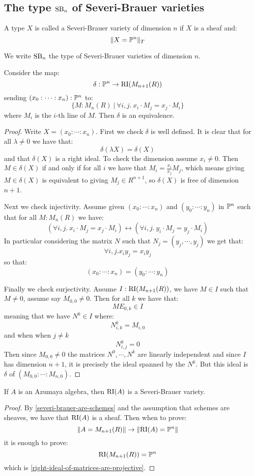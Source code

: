 \subsection{The type $\mathrm{SB}_n$ of Severi-Brauer varieties}

\begin{definition}
A type $X$ is called a Severi-Brauer variety of dimension $n$ if $X$ is a sheaf and:
\[\lVert X=\mathbb{P}^n \rVert_T\]
\end{definition}

We write $\mathrm{SB}_n$ the type of Severi-Brauer varieties of dimension $n$.

\begin{lemma}\label{right-ideal-of-matrices-are-projective}
Consider the map:
\[\delta:\mathbb{P}^n \to \mathrm{RI}(M_{n+1}(R))\]
sending $(x_0:\cdots:x_n):\mathbb{P}^n$ to:
\[\{M:M_n(R)\ |\ \forall i,j.\ x_i\cdot M_j = x_j\cdot M_i\}\]
where $M_i$ is the $i$-th line of $M$. Then $\delta$ is an equivalence.
\end{lemma}

\begin{proof}
Write $X=(x_0:\cdots:x_n)$. First we check $\delta$ is well defined. It is clear that for all $\lambda\not=0$ we have that:
\[\delta(\lambda X) = \delta(X)\]
and that $\delta(X)$ is a right ideal. To check the dimension assume $x_i\not=0$. Then $M\in\delta(X)$ if and only if for all $i$ we have that $M_i = \frac{x_i}{x_j} M_j$, which means giving $M\in\delta(X)$ is equivalent to giving $M_j\in R^{n+1}$, so $\delta(X)$ is free of dimension $n+1$.

Next we check injectivity. Assume given $(x_0:\cdots:x_n)$ and $(y_0:\cdots:y_n)$ in $\mathbb{P}^n$ such that for all $M:M_n(R)$ we have:
\[(\forall i,j.\ x_i\cdot M_j = x_j\cdot M_i) \leftrightarrow (\forall i,j.\ y_i\cdot M_j = y_j\cdot M_i)\]
In particular considering the matrix $N$ such that $N_j = (y_j,\cdots,y_j)$ we get that:
\[\forall i,j. x_iy_j=x_iy_j\] 
so that:
\[(x_0:\cdots:x_n) = (y_0:\cdots:y_n)\]

Finally we check surjectivity. Assume $I:\mathrm{RI}(M_{n+1}(R))$, we have $M\in I$ such that $M\not=0$, assume say $M_{0,0}\not=0$. Then for all $k$ we have that:
\[ME_{0,k}\in I\]
meaning that we have $N^k\in I$ where:
\[N^k_{i,k} = M_{i,0}\]
and when when $j\not=k$
\[N^k_{i,j} = 0\]
Then since $M_{0,0}\not=0$ the matrices $N^0,\cdots,N^k$ are linearly independent and since $I$ has dimension $n+1$, it is precisely the ideal spanned by the $N^k$. But this ideal is $\delta$ of $(M_{0,0}:\cdots:M_{n,0})$.
\end{proof}

\begin{lemma}
If $A$ is an Azumaya algebra, then $\mathrm{RI}(A)$ is a Severi-Brauer variety.
\end{lemma}

\begin{proof}
By \cref{severi-brauer-are-schemes} and the assumption that schemes are sheaves, we have that $\mathrm{RI}(A)$ is a sheaf. Then when to prove:
\[\lVert A=M_{n+1}(R) \rVert \to \lVert \mathrm{RI}(A)=\mathbb{P}^n \rVert\]
it is enough to prove:
\[\mathrm{RI}(M_{n+1}(R)) = \mathbb{P}^n\]
which is \cref{right-ideal-of-matrices-are-projective}.
\end{proof}
